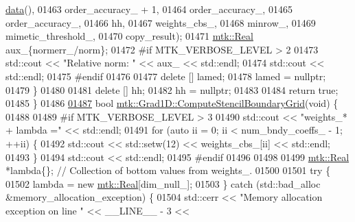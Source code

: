 \begin{DoxyCode}
{{      \hyperlink{classmtk_1_1DenseMatrix_a0c33b8a9e01d157c61ddbdf807c25d84}{data}(),
01463                                                         order\_accuracy\_ + 1,
01464                                                         order\_accuracy\_,
01465                                                         order\_accuracy\_,
01466                                                         hh,
01467                                                         weights\_cbs\_,
01468                                                         minrow\_,
01469                                                         mimetic\_threshold\_,
01470                                                         copy\_result);
01471     \hyperlink{group__c01-roots_gac080bbbf5cbb5502c9f00405f894857d}{mtk::Real} aux\_\{normerr\_/norm\};
01472 \textcolor{preprocessor}{    #if MTK\_VERBOSE\_LEVEL > 2}
01473     std::cout << \textcolor{stringliteral}{"Relative norm: "} << aux\_ << std::endl;
01474     std::cout << std::endl;
01475 \textcolor{preprocessor}{    #endif}
01476 
01477     \textcolor{keyword}{delete} [] lamed;
01478     lamed = \textcolor{keyword}{nullptr};
01479   \}
01480 
01481   \textcolor{keyword}{delete} [] hh;
01482   hh = \textcolor{keyword}{nullptr};
01483 
01484   \textcolor{keywordflow}{return} \textcolor{keyword}{true};
01485 \}
01486 
\hypertarget{mtk__grad__1d_8cc_source_l01487}{}\hyperlink{classmtk_1_1Grad1D_a7ad1cecf6b52647263208ffaea0ee1e5}{01487} \textcolor{keywordtype}{bool} \hyperlink{classmtk_1_1Grad1D_a7ad1cecf6b52647263208ffaea0ee1e5}{mtk::Grad1D::ComputeStencilBoundaryGrid}(\textcolor{keywordtype}{void}) \{
01488 
01489 \textcolor{preprocessor}{  #if MTK\_VERBOSE\_LEVEL > 3}
01490   std::cout << \textcolor{stringliteral}{"weights\_* + lambda ="} << std::endl;
01491   \textcolor{keywordflow}{for} (\textcolor{keyword}{auto} ii = 0; ii < num\_bndy\_coeffs\_ - 1; ++ii) \{
01492     std::cout << std::setw(12) << weights\_cbs\_[ii] << std::endl;
01493   \}
01494   std::cout << std::endl;
01495 \textcolor{preprocessor}{  #endif}
01496 
01498 
01499   \hyperlink{group__c01-roots_gac080bbbf5cbb5502c9f00405f894857d}{mtk::Real} *lambda\{\}; \textcolor{comment}{// Collection of bottom values from weights\_.}
01500 
01501   \textcolor{keywordflow}{try} \{
01502     lambda = \textcolor{keyword}{new} \hyperlink{group__c01-roots_gac080bbbf5cbb5502c9f00405f894857d}{mtk::Real}[dim\_null\_];
01503   \} \textcolor{keywordflow}{catch} (std::bad\_alloc &memory\_allocation\_exception) \{
01504     std::cerr << \textcolor{stringliteral}{"Memory allocation exception on line "} << \_\_LINE\_\_ - 3 <<
}}
\end{DoxyCode}
